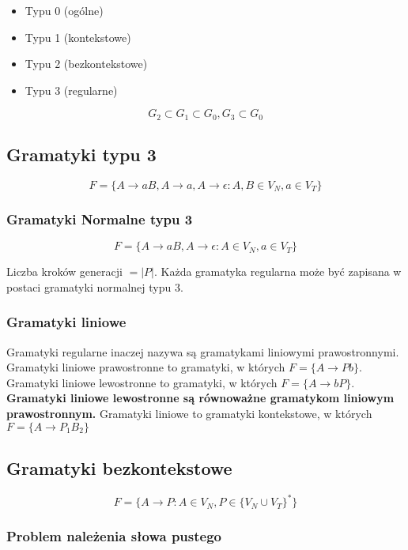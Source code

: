\documentclass{../notatki}
\begin{document}
\begin{itemize}
  \item Typu 0 (ogólne)
  \item Typu 1 (kontekstowe)
  \item Typu 2 (bezkontekstowe)
  \item Typu 3 (regularne)
\end{itemize}

$$
G_2 \subset G_1 \subset G_0, G_3 \subset G_0
$$

\subsection{Gramatyki typu 3}

$$
F = \{A \rightarrow aB, A \rightarrow a, A \rightarrow \epsilon : A,
B \in V_N, a \in V_T\}
$$

\subsubsection{Gramatyki Normalne typu 3}

$$
F = \{A \rightarrow aB, A \rightarrow \epsilon : A \in V_N, a \in V_T\}
$$

Liczba kroków generacji $= |P|$.
Każda gramatyka regularna może być zapisana w postaci gramatyki
normalnej typu 3.

\subsubsection{Gramatyki liniowe}

Gramatyki regularne inaczej nazywa są gramatykami liniowymi prawostronnymi.
Gramatyki liniowe prawostronne to gramatyki, w których $F = \{A
\rightarrow Pb\}$.
Gramatyki liniowe lewostronne to gramatyki, w których $F = \{A
\rightarrow bP\}$.
\textbf{Gramatyki liniowe lewostronne są równoważne gramatykom
liniowym prawostronnym.}
Gramatyki liniowe to gramatyki kontekstowe, w których $F = \{A
\rightarrow P_1B_2\}$

\subsection{Gramatyki bezkontekstowe}

$$
F = \{A \rightarrow P : A \in V_N, P \in \{V_N \cup V_T\}^*\}
$$

\subsubsection{Problem należenia słowa pustego}
\end{document}
